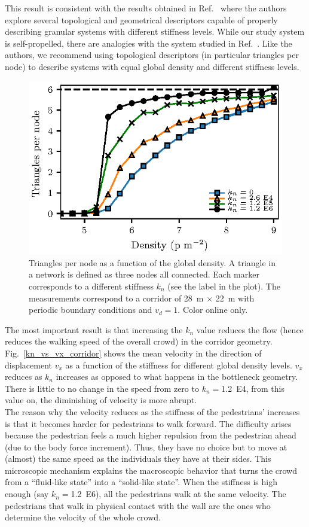 \documentclass[preprint,12pt]{elsarticle}
\begin{document}
This result is consistent with the results obtained in Ref.~\cite{pugnaloni_2013} where the authors explore several topological and geometrical descriptors capable of properly describing granular systems with different stiffness levels. While our study system is self-propelled, there are analogies with the system studied in Ref.~\cite{pugnaloni_2013}. Like the authors, we recommend using topological descriptors (in particular triangles per node) to describe systems with equal global density and different stiffness levels.\\

\begin{figure}[htbp!]
\centering
\includegraphics[width=0.7\columnwidth]
{./triangles.eps}
\caption{\label{triangles} Triangles per node as a function of the global density. A triangle in a network is defined as three nodes all connected. Each marker corresponds to a different stiffness $k_n$ (see the label in the plot). The measurements correspond to a corridor of 28~m $\times$ 22~m with periodic boundary conditions and $v_d=1$. Color online only. }
\end{figure}

The most important result is that increasing the $k_n$ value reduces the flow (hence reduces the walking speed of the overall crowd) in the corridor geometry. Fig.~\ref{kn_vs_vx_corridor} shows the mean velocity in the direction of displacement $v_x$ as a function of the stiffness for different global density levels. $v_x$ reduces as $k_n$ increases as opposed to what happens in the bottleneck geometry. There is little to no change in the speed from zero to $k_n=$1.2~E4, from this value on, the diminishing of velocity is more abrupt.\\

The reason why the velocity reduces as the stiffness of the pedestrians' increases is that it becomes harder for pedestrians to walk forward. The difficulty arises because the pedestrian feels a much higher repulsion from the pedestrian ahead (due to the body force increment). Thus, they have no choice but to move at (almost) the same speed as the individuals they have at their sides. This microscopic mechanism explains the macroscopic behavior that turns the crowd from a ``fluid-like state'' into a ``solid-like state''. When the stiffness is high enough (say $k_n=$1.2~E6), all the pedestrians walk at the same velocity. The pedestrians that walk in physical contact with the wall are the ones who determine the velocity of the whole crowd.\\
\end{document}

